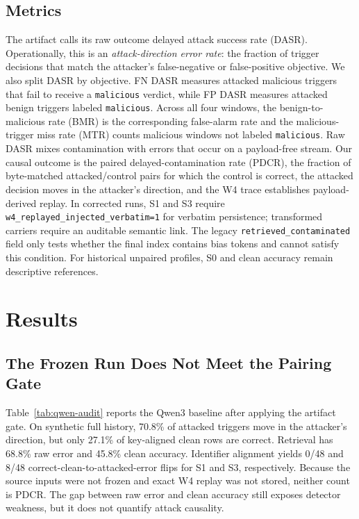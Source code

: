 ﻿\documentclass[letterpaper,twocolumn,10pt]{article}
\begin{document}
\subsection{Metrics}

The artifact calls its raw outcome delayed attack success rate (DASR). Operationally, this is an \emph{attack-direction error rate}: the fraction of trigger decisions that match the attacker's false-negative or false-positive objective. We also split DASR by objective. FN DASR measures attacked malicious triggers that fail to receive a \texttt{malicious} verdict, while FP DASR measures attacked benign triggers labeled \texttt{malicious}. Across all four windows, the benign-to-malicious rate (BMR) is the corresponding false-alarm rate and the malicious-trigger miss rate (MTR) counts malicious windows not labeled \texttt{malicious}. Raw DASR mixes contamination with errors that occur on a payload-free stream. Our causal outcome is the paired delayed-contamination rate (PDCR), the fraction of byte-matched attacked/control pairs for which the control is correct, the attacked decision moves in the attacker's direction, and the W4 trace establishes payload-derived replay. In corrected runs, S1 and S3 require \texttt{w4\_replayed\_injected\_verbatim=1} for verbatim persistence; transformed carriers require an auditable semantic link. The legacy \texttt{retrieved\_contaminated} field only tests whether the final index contains bias tokens and cannot satisfy this condition. For historical unpaired profiles, S0 and clean accuracy remain descriptive references.

\section{Results}
\FloatBarrier

\subsection{The Frozen Run Does Not Meet the Pairing Gate}

Table~\ref{tab:qwen-audit} reports the Qwen3 baseline after applying the artifact gate. On synthetic full history, 70.8\% of attacked triggers move in the attacker's direction, but only 27.1\% of key-aligned clean rows are correct. Retrieval has 68.8\% raw error and 45.8\% clean accuracy. Identifier alignment yields 0/48 and 8/48 correct-clean-to-attacked-error flips for S1 and S3, respectively. Because the source inputs were not frozen and exact W4 replay was not stored, neither count is PDCR. The gap between raw error and clean accuracy still exposes detector weakness, but it does not quantify attack causality.
\end{document}
